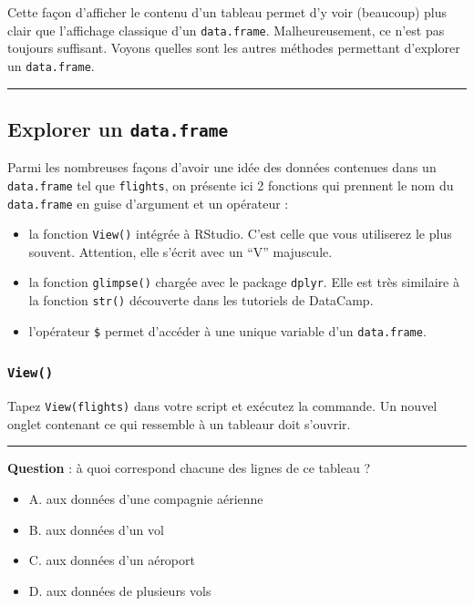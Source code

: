 \documentclass[a4paperpaper,]{article}
\providecommand{\tightlist}{%
  \setlength{\itemsep}{0pt}\setlength{\parskip}{0pt}}
\theoremstyle{definition}
\theoremstyle{definition}
\theoremstyle{definition}
\theoremstyle{remark}
\begin{document}
Cette façon d'afficher le contenu d'un tableau permet d'y voir
(beaucoup) plus clair que l'affichage classique d'un
\texttt{data.frame}. Malheureusement, ce n'est pas toujours suffisant.
Voyons quelles sont les autres méthodes permettant d'explorer un
\texttt{data.frame}.

\begin{center}\rule{0.5\linewidth}{\linethickness}\end{center}

\subsection{\texorpdfstring{Explorer un
\texttt{data.frame}}{Explorer un data.frame}}\label{explorer-un-data.frame}

Parmi les nombreuses façons d'avoir une idée des données contenues dans
un \texttt{data.frame} tel que \texttt{flights}, on présente ici 2
fonctions qui prennent le nom du \texttt{data.frame} en guise d'argument
et un opérateur :

\begin{itemize}
\tightlist
\item
  la fonction \texttt{View()} intégrée à RStudio. C'est celle que vous
  utiliserez le plus souvent. Attention, elle s'écrit avec un ``V''
  majuscule.
\item
  la fonction \texttt{glimpse()} chargée avec le package \texttt{dplyr}.
  Elle est très similaire à la fonction \texttt{str()} découverte dans
  les tutoriels de DataCamp.
\item
  l'opérateur \texttt{\$} permet d'accéder à une unique variable d'un
  \texttt{data.frame}.
\end{itemize}

\subsubsection{\texorpdfstring{\texttt{View()}}{View()}}\label{View}

Tapez \texttt{View(flights)} dans votre script et exécutez la commande.
Un nouvel onglet contenant ce qui ressemble à un tableaur doit s'ouvrir.

\begin{center}\rule{0.5\linewidth}{\linethickness}\end{center}

\textbf{Question } : à quoi correspond chacune des lignes de ce tableau
?

\begin{itemize}
\tightlist
\item
  A. aux données d'une compagnie aérienne
\item
  B. aux données d'un vol
\item
  C. aux données d'un aéroport
\item
  D. aux données de plusieurs vols
\end{itemize}
\end{document}
